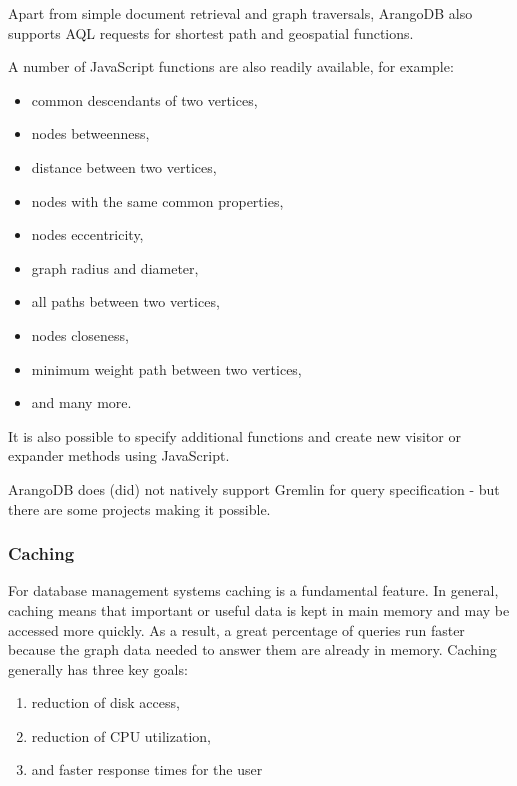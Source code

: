 Apart from simple document retrieval and graph traversals, ArangoDB also supports \acrshort{AQL} requests for shortest path and geospatial functions.

A number of JavaScript functions are also readily available, for example:
 \begin{itemize}[noitemsep]
	\item common descendants of two vertices,
	\item nodes betweenness,
	\item distance between two vertices,
	\item nodes with the same common properties,
	\item nodes eccentricity,
	\item graph radius and diameter,
	\item all paths between two vertices,
	\item nodes closeness,
	\item minimum weight path between two vertices,
	\item and many more.
\end{itemize}
It is also possible to specify additional functions and create new visitor or expander methods using JavaScript.

ArangoDB does (did) not natively support Gremlin for query specification
 - but there are some projects making it possible.

\subsubsection{Caching}\label{subsubsection:LiteratureReview/ReviewofGraphDatabaseSystems/AGDBMSindetailArangoDB/Caching}
For database management systems caching is a fundamental feature.
In general, caching means that important or useful data is kept in main memory and may be accessed more quickly.
As a result, a great percentage of queries run faster because the graph data needed to answer them are already in memory.
Caching generally has three key goals:
 \begin{enumerate}[noitemsep]
	\item reduction of disk access,
	\item reduction of CPU utilization,
	\item and faster response times for the user
\end{enumerate}

